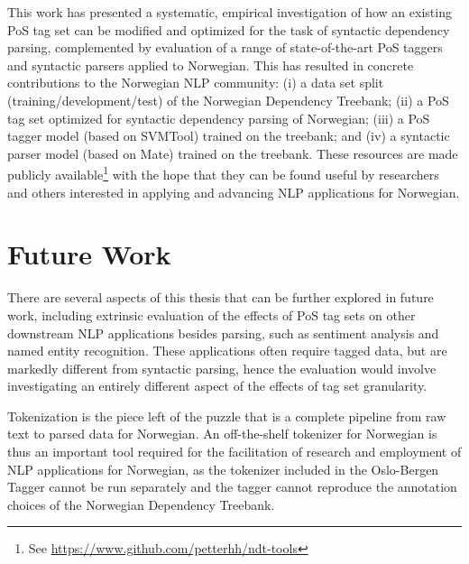 \documentclass[a4paper,12pt,english]{book}
\begin{document}
This work has presented a systematic, empirical investigation of how an
existing PoS tag set can be modified and optimized for the task of syntactic
dependency parsing, complemented by evaluation of a range of state-of-the-art
PoS taggers and syntactic parsers applied to Norwegian. This has resulted in
concrete contributions to the Norwegian NLP community: (i) a data set split
(training/development/test) of the Norwegian Dependency Treebank; (ii) a PoS
tag set optimized for syntactic dependency parsing of Norwegian; (iii) a PoS
tagger model (based on SVMTool) trained on the treebank; and (iv) a syntactic
parser model (based on Mate) trained on the treebank. These resources are made
publicly available\footnote{See
    \url{https://www.github.com/petterhh/ndt-tools}} with the hope that they
can be found useful by researchers and others interested in applying and
advancing NLP applications for Norwegian.

\section{Future Work}
\label{sec:futurework}
There are several aspects of this thesis that can be further explored in future
work, including extrinsic evaluation of the effects of PoS tag sets on other
downstream NLP applications besides parsing, such as sentiment analysis and
named entity recognition. These applications often require tagged data, but are
markedly different from syntactic parsing, hence the evaluation would involve
investigating an entirely different aspect of the effects of tag set
granularity.


Tokenization is the piece left of the puzzle that is a complete pipeline from
raw text to parsed data for Norwegian.
An off-the-shelf tokenizer for Norwegian is thus an important tool required for
the facilitation of research and employment of NLP applications for Norwegian,
as the tokenizer included in the Oslo-Bergen Tagger cannot be run separately
and the tagger cannot reproduce the annotation choices of the Norwegian
Dependency Treebank.
\end{document}
